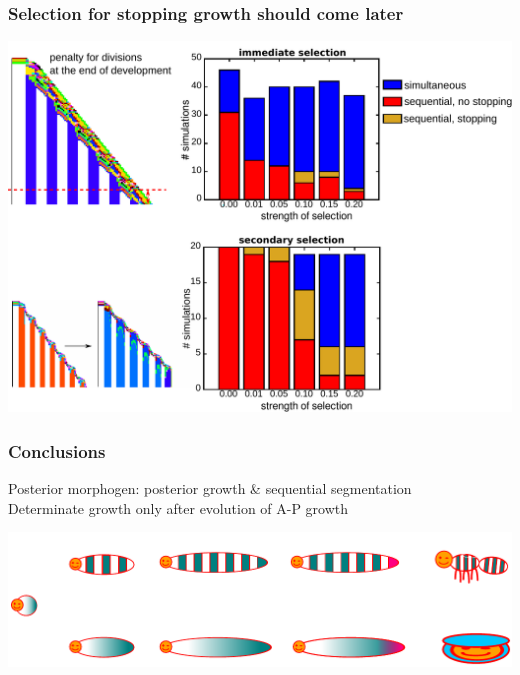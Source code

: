 \documentclass[compress]{beamer}
\begin{document}
\begin{frame}
    \frametitle{Selection for stopping growth should come later}
    \begin{center}
     \includegraphics[width=.9\textwidth]{figures/stopgrowth_start.pdf}\\
    \end{center}
\end{frame}

\begin{frame}
    \frametitle{Conclusions}
    Posterior morphogen: posterior growth \& sequential segmentation\\
    Determinate growth only after evolution of A-P growth\\
    \begin{center}
     \includegraphics[width=1.\textwidth]{figures/conclusions.pdf}\\
    \end{center}
\end{frame}
\end{document}
